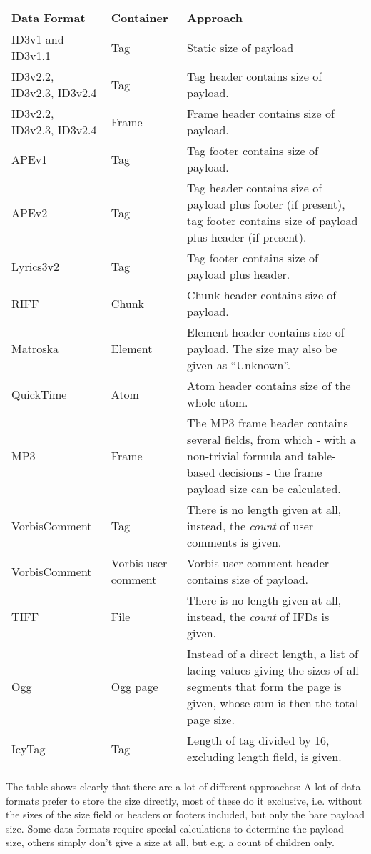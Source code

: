 \begin{longtable}{|p{}|p{}|p{}|}
	\hline
	Data Format & Container & Approach\\
	\endhead
	\hline
   ID3v1 and ID3v1.1 & Tag & Static size of payload \\
	\hline
   ID3v2.2, ID3v2.3, ID3v2.4 & Tag & Tag header contains size of payload. \\
	\hline
   ID3v2.2, ID3v2.3, ID3v2.4 & Frame & Frame header contains size of payload. \\
	\hline
   APEv1 & Tag & Tag footer contains size of payload. \\
	\hline
   APEv2 & Tag & Tag header contains size of payload plus footer (if present), tag footer contains size of payload plus header (if present). \\
	\hline
   Lyrics3v2 & Tag & Tag footer contains size of payload plus header. \\
	\hline
   RIFF & Chunk & Chunk header contains size of payload. \\
	\hline
   Matroska & Element & Element header contains size of payload. The size may also be given as ``Unknown''. \\
	\hline
   QuickTime & Atom & Atom header contains size of the whole atom. \\
	\hline
   MP3 & Frame & The MP3 frame header contains several fields, from which - with a non-trivial formula and table-based decisions - the frame payload size can be calculated. \\
	\hline
   VorbisComment & Tag & There is no length given at all, instead, the \emph{count} of user comments is given. \\
	\hline
   VorbisComment & Vorbis user comment & Vorbis user comment header contains size of payload. \\
	\hline
   TIFF & File & There is no length given at all, instead, the \emph{count} of IFDs is given. \\
	\hline
   Ogg & Ogg page & Instead of a direct length, a list of lacing values giving the sizes of all segments that form the page is given, whose sum is then the total page size. \\
	\hline
   IcyTag & Tag & Length of tag divided by 16, excluding length field, is given. \\
\end{longtable}

The table shows clearly that there are a lot of different approaches: A lot of data formats prefer to store the size directly, most of these do it exclusive, i.e. without the sizes of the size field or headers or footers included, but only the bare payload size. Some data formats require special calculations to determine the payload size, others simply don't give a size at all, but e.g. a count of children only.

